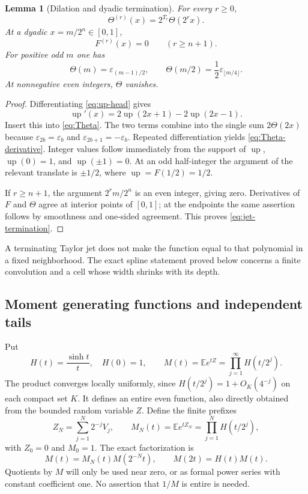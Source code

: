 \documentclass[11pt,a4paper]{article}
\numberwithin{equation}{section}
\newtheorem{lemma}[theorem]{Lemma}
\theoremstyle{definition}
\theoremstyle{remark}
\newcommand{\up}{\operatorname{up}}
\newcommand{\E}{\mathbb E}
\newcommand{\eps}{\varepsilon}
\begin{document}
\begin{lemma}[Dilation and dyadic termination]
\label{lem:derivatives}
For every $r\ge0$,
\begin{equation}
 \Theta^{(r)}(x)=2^{T_r}\Theta(2^r x).
 \label{eq:Theta-derivative}
\end{equation}
At a dyadic $x=m/2^n\in[0,1]$,
\begin{equation}
 F^{(r)}(x)=0\qquad(r\ge n+1).
 \label{eq:jet-termination}
\end{equation}
For positive odd $m$ one has
\begin{equation}
 \Theta(m)=\eps_{(m-1)/2},\qquad
 \Theta(m/2)=\frac12\eps_{\lfloor m/4\rfloor}.
 \label{eq:integer-half-values}
\end{equation}
At nonnegative even integers, $\Theta$ vanishes.
\end{lemma}
\begin{proof}
Differentiating \cref{eq:up-head} gives
\[
 \up'(x)=2\up(2x+1)-2\up(2x-1).
\]
Insert this into \cref{eq:Theta}. The two terms combine into the single sum $2\Theta(2x)$ because $\eps_{2b}=\eps_b$ and $\eps_{2b+1}=-\eps_b$. Repeated differentiation yields \cref{eq:Theta-derivative}. Integer values follow immediately from the support of $\up$, $\up(0)=1$, and $\up(\pm1)=0$. At an odd half-integer the argument of the relevant translate is $\pm1/2$, where $\up=F(1/2)=1/2$.

If $r\ge n+1$, the argument $2^r m/2^n$ is an even integer, giving zero. Derivatives of $F$ and $\Theta$ agree at interior points of $[0,1]$; at the endpoints the same assertion follows by smoothness and one-sided agreement. This proves \cref{eq:jet-termination}.
\end{proof}
A terminating Taylor jet does not make the function equal to that polynomial in a fixed neighborhood. The exact spline statement proved below concerns a finite convolution and a cell whose width shrinks with its depth.

\subsection{Moment generating functions and independent tails}
Put
\begin{equation}
 H(t)=\frac{\sinh t}{t},\quad H(0)=1,
 \qquad M(t)=\E e^{tZ}=\prod_{j=1}^{\infty}H(t/2^j).
 \label{eq:MGF}
\end{equation}
The product converges locally uniformly, since $H(t/2^j)=1+O_K(4^{-j})$ on each compact set $K$. It defines an entire even function, also directly obtained from the bounded random variable $Z$. Define the finite prefixes
\begin{equation}
 Z_N=\sum_{j=1}^{N}2^{-j}V_j,
 \qquad M_N(t)=\E e^{tZ_N}=\prod_{j=1}^{N}H(t/2^j),
 \label{eq:prefix-Z}
\end{equation}
with $Z_0=0$ and $M_0=1$. The exact factorization is
\begin{equation}
 M(t)=M_N(t)M(2^{-N}t),\qquad M(2t)=H(t)M(t).
 \label{eq:tail-MGF}
\end{equation}
Quotients by $M$ will only be used near zero, or as formal power series with constant coefficient one. No assertion that $1/M$ is entire is needed.
\end{document}
